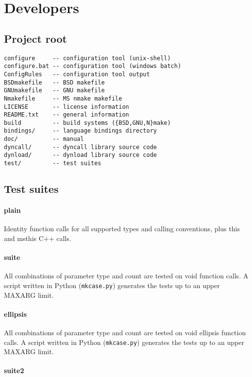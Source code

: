 \newpage
\section{Developers}

\subsection{Project root}
\begin{verbatim}
configure     -- configuration tool (unix-shell)
configure.bat -- configuration tool (windows batch)
ConfigRules   -- configuration tool output
BSDmakefile   -- BSD makefile
GNUmakefile   -- GNU makefile
Nmakefile     -- MS nmake makefile
LICENSE       -- license information
README.txt    -- general information
build         -- build systems ({BSD,GNU,N}make)
bindings/     -- language bindings directory
doc/          -- manual
dyncall/      -- dyncall library source code
dynload/      -- dynload library source code
test/         -- test suites
\end{verbatim}

\subsection{Test suites}

\paragraph{plain}

Identity function calls for all supported types and calling conventions,
plus this and msthis C++ calls.

\paragraph{suite}

All combinations of parameter type and count are tested on void function calls.
A script written in Python ({\tt mkcase.py}) generates the tests up to
an upper MAXARG limit.

\paragraph{ellipsis}

All combinations of parameter type and count are tested on void ellipsis 
function calls. A script written in Python ({\tt mkcase.py}) generates the 
tests up to an upper MAXARG limit.

\paragraph{suite2}

